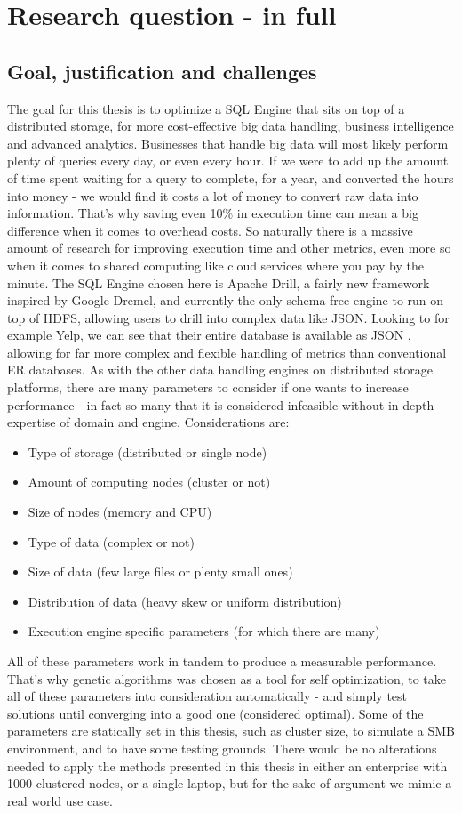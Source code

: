 \documentclass[a4paper,english]{report}
\begin{document}
		\section{Research question - in full}
		\subsection{Goal, justification and challenges}
		The goal for this thesis is to optimize a SQL Engine that sits on top of a distributed storage, for more cost-effective big data handling, business intelligence and advanced analytics. Businesses that handle big data will most likely perform plenty of queries every day, or even every hour. If we were to add up the amount of time spent waiting for a query to complete, for a year, and converted the hours into money - we would find it costs a lot of money to convert raw data into information. That's why saving even 10\% in execution time can mean a big difference when it comes to overhead costs. So naturally there is a massive amount of research for improving execution time and other metrics, even more so when it comes to shared computing like cloud services where you pay by the minute. The SQL Engine chosen here is Apache Drill, a fairly new framework inspired by Google Dremel, and currently the only schema-free engine to run on top of HDFS, allowing users to drill into complex data like JSON. Looking to for example Yelp, we can see that their entire database is available as JSON \cite{yelp}, allowing for far more complex  and flexible handling of metrics than conventional ER databases. As with the other data handling engines on distributed storage platforms, there are many parameters to consider if one wants to increase performance - in fact so many that it is considered infeasible without in depth expertise of domain and engine. Considerations are:
		\begin{itemize}
			\item Type of storage (distributed or single node)
			\item Amount of computing nodes (cluster or not)
			\item Size of nodes (memory and CPU)
			\item Type of data (complex or not)
			\item Size of data (few large files or plenty small ones)
			\item Distribution of data (heavy skew or uniform distribution)
			\item Execution engine specific parameters (for which there are many)
		\end{itemize}
		All of these parameters work in tandem to produce a measurable performance. That's why genetic algorithms was chosen as a tool for self optimization, to take all of these parameters into consideration automatically - and simply test solutions until converging into a good one (considered optimal). Some of the parameters are statically set in this thesis, such as cluster size, to simulate a SMB environment, and to have some testing grounds. There would be no alterations needed to apply the methods presented in this thesis in either an enterprise with 1000 clustered nodes, or a single laptop, but for the sake of argument we mimic a real world use case.
\end{document}
